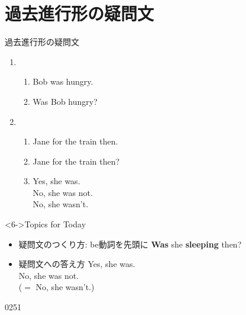 \documentclass[aspectratio=169,xcolor={dvipsnames,table}]{beamer}
\begin{document}
\section{過去進行形の疑問文}
\begin{frame}[plain]{過去進行形の疑問文}
  \begin{enumerate}
  \item \begin{enumerate}
	 \item<1-> Bob was hungry.
	 \item<2-> Was Bob hungry?
	\end{enumerate}
  \item \begin{enumerate}
	 \item<3-> Jane  for the train then.
	 \item<4->  Jane  for the train then?
	 \item<5-> Yes, she was.\\
                   No, she was not.\\
                   No, she wasn't.
	\end{enumerate}
 \end{enumerate}

\begin{block}<6->{Topics for Today}
\begin{itemize}[square]\small
 \item 疑問文のつくり方: be動詞を先頭に
\hfill{}{{\bfseries Was} she {\bfseries sleeping} then?}
 \item 疑問文への答え方
\hfill{}Yes, she was.\\
\hfill{}No, she was not.\\
\hfill{}($=$ No, she wasn't.)
\end{itemize}
\end{block}

\hfill{\tiny 0251}\,{\scriptsize {}}

\end{frame}
\end{document}
